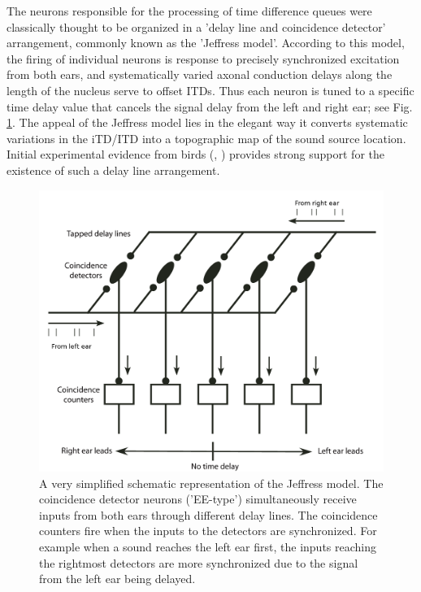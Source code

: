 \documentclass[12pt]{book}
\begin{document}
The neurons responsible for 
the processing of time difference queues were classically thought to be organized in a 'delay line and coincidence detector' arrangement, commonly
known as the 'Jeffress model'\cite{jeffressmodel}. According to this model, the firing of individual neurons is response to precisely synchronized excitation
from both ears, and systematically varied axonal conduction delays along the length of the nucleus serve to offset ITDs. Thus each neuron is tuned to a 
specific time delay value that cancels the signal delay from the left and right ear; see Fig. \ref{jeffressmodel}. The appeal of the Jeffress model lies in the elegant way it converts systematic variations in the iTD/ITD into
a topographic map of the sound source location. Initial experimental evidence from birds (\cite{carrkonishi}, \cite{parksrubel}) provides strong support 
for the existence of such a delay line arrangement.
\begin{figure}[ht!]
 \centering
 \includegraphics[width=0.6\linewidth]{Diagrams/Jeffress.png}
 \caption[Delay line coincidence detector - Jeffress model]{A very simplified schematic representation of the Jeffress model. The coincidence detector neurons ('EE-type')
 simultaneously receive inputs from both ears through different delay lines. The coincidence counters fire when the inputs to the detectors are synchronized. For
 example when a sound reaches the left ear first, the inputs reaching the rightmost detectors are more synchronized due to the signal from the left ear being
 delayed.}
 \label{jeffressmodel}
\end{figure}
\end{document}
